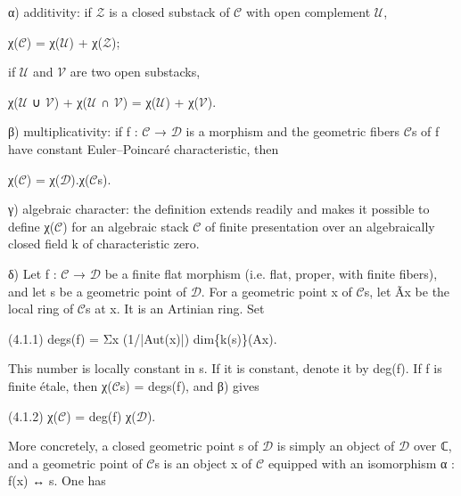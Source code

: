 \documentclass[11pt,a4paper]{article}
\begin{document}
α) additivity: if \ensuremath{\mathcal{Z}} is a closed substack of \ensuremath{\mathcal{C}} with open complement \ensuremath{\mathcal{U}},

χ(\ensuremath{\mathcal{C}}) = χ(\ensuremath{\mathcal{U}}) + χ(\ensuremath{\mathcal{Z}});

if \ensuremath{\mathcal{U}} and \ensuremath{\mathcal{V}} are two open substacks,

χ(\ensuremath{\mathcal{U}} ∪ \ensuremath{\mathcal{V}}) + χ(\ensuremath{\mathcal{U}} ∩ \ensuremath{\mathcal{V}}) = χ(\ensuremath{\mathcal{U}}) + χ(\ensuremath{\mathcal{V}}).

β) multiplicativity: if f : \ensuremath{\mathcal{C}} → \ensuremath{\mathcal{D}} is a morphism and the geometric fibers \ensuremath{\mathcal{C}}\textunderscore{}s of f have constant Euler--Poincaré characteristic, then

χ(\ensuremath{\mathcal{C}}) = χ(\ensuremath{\mathcal{D}}).χ(\ensuremath{\mathcal{C}}\textunderscore{}s).

γ) algebraic character: the definition extends readily and makes it possible to define χ(\ensuremath{\mathcal{C}}) for an algebraic stack \ensuremath{\mathcal{C}} of finite presentation over an algebraically closed field k of characteristic zero.

δ) Let f : \ensuremath{\mathcal{C}} → \ensuremath{\mathcal{D}} be a finite flat morphism (i.e. flat, proper, with finite fibers), and let s be a geometric point of \ensuremath{\mathcal{D}}. For a geometric point x of \ensuremath{\mathcal{C}}\textunderscore{}s, let Ã\textunderscore{}x be the local ring of \ensuremath{\mathcal{C}}\textunderscore{}s at x. It is an Artinian ring. Set

(4.1.1)        deg\textunderscore{}s(f) = Σ\textunderscore{}x (1/|Aut(x)|) dim\textunderscore{}\{k(s)\}(A\textunderscore{}x).

This number is locally constant in s. If it is constant, denote it by deg(f). If f is finite étale, then χ(\ensuremath{\mathcal{C}}\textunderscore{}s) = deg\textunderscore{}s(f), and β) gives

(4.1.2)        χ(\ensuremath{\mathcal{C}}) = deg(f) χ(\ensuremath{\mathcal{D}}).

More concretely, a closed geometric point s of \ensuremath{\mathcal{D}} is simply an object of \ensuremath{\mathcal{D}} over ℂ, and a geometric point of \ensuremath{\mathcal{C}}\textunderscore{}s is an object x of \ensuremath{\mathcal{C}} equipped with an isomorphism α : f(x) ↔ s. One has
\end{document}
